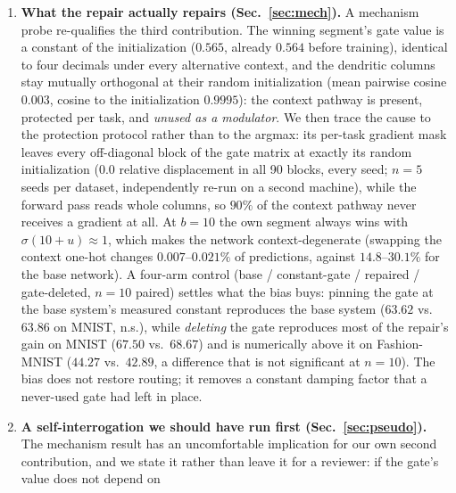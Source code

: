 \documentclass[10pt]{article}
\begin{document}
\begin{enumerate}
      smallest gains;
      zero mortality with no gain), so gate death is neither necessary nor
      sufficient. A $2\times 2$ width $\times$ normalization scan
      ($320$ runs) removes the one confound we had to disclose: normalization
      collapses the gain at both widths, while widening the trunk $7.8\times$
      \emph{increases} it.
\item \textbf{What the repair actually repairs (Sec.~\ref{sec:mech}).} A
      mechanism probe re-qualifies the third contribution. The winning
      segment's gate value is a constant of the initialization ($0.565$,
      already $0.564$ before training), identical to four decimals under
      every alternative context, and the dendritic columns stay mutually
      orthogonal at their random initialization (mean pairwise cosine
      $0.003$, cosine to the initialization $0.9995$): the context pathway
      is present, protected per task, and \emph{unused as a modulator}.
      We then trace the cause to the protection protocol rather than to
      the argmax: its per-task gradient mask leaves every off-diagonal
      block of the gate matrix at exactly its random initialization
      ($0.0$ relative displacement in all 90 blocks, every seed; $n=5$
      seeds per dataset, independently re-run on a second machine), while
      the forward pass reads whole columns, so $90\%$ of the context
      pathway never receives a gradient at all. At
      $b{=}10$ the own segment always wins with $\sigma(10+u)\approx 1$,
      which makes the network context-degenerate (swapping the context
      one-hot changes $0.007$--$0.021\%$ of predictions, against
      $14.8$--$30.1\%$ for the base network). A four-arm control (base /
      constant-gate / repaired / gate-deleted, $n{=}10$ paired) settles
      what the bias buys: pinning the gate at the base system's measured
      constant reproduces the base system ($63.62$ vs.\ $63.86$ on MNIST,
      n.s.), while \emph{deleting} the gate reproduces most of the repair's
      gain on MNIST ($67.50$ vs.\ $68.67$) and is numerically above it on
      Fashion-MNIST ($44.27$ vs.\ $42.89$, a difference that is not significant
      at $n{=}10$). The bias does not restore
      routing; it removes a constant damping factor that a never-used gate
      had left in place.
\item \textbf{A self-interrogation we should have run first
      (Sec.~\ref{sec:pseudo}).} The mechanism result has an uncomfortable
      implication for our own second contribution, and we state it rather
      than leave it for a reviewer: if the gate's value does not depend on

\end{enumerate}
\end{document}
